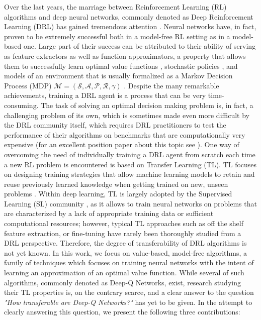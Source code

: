 Over the last years, the marriage between Reinforcement Learning (RL) algorithms and deep neural networks, commonly denoted as Deep Reinforcement Learning (DRL) \cite{franccois2018introduction} has gained tremendous attention \cite{henderson2018deep}. Neural networks have, in fact, proven to be extremely successful both in a model-free RL setting as in a model-based one. Large part of their success can be attributed to their ability of serving as feature extractors as well as function approximators, a property that allows them to successfully learn optimal value functions \cite{mnih2013playing,mnih2015human,van2016deep,zhao2016deep,wang2016dueling,sabatelli2020deep}, stochastic policies \cite{lillicrap2015continuous,schulman2015high,schulman2015trust,wang2016sample,mnih2016asynchronous,schulman2017proximal,haarnoja2018soft,fujimoto2018addressing}, and models of an environment \cite{ha2018world,kaiser2019model,hafner2019dream,hafner2019learning,hafner2020mastering} that is usually formalized as a Markov Decision Process (MDP) $\mathcal{M}=(\mathcal{S},\mathcal{A},\mathcal{P},\mathcal{R},\gamma)$ \cite{puterman1990markov}. Despite the many remarkable achievements, training a DRL agent is a process that can be very time-consuming. The task of solving an optimal decision making problem is,  in fact, a challenging problem of its own, which is sometimes made even more difficult by the DRL community itself, which requires DRL practitioners to test the performance of their algorithms on benchmarks that are computationally very expensive (for an excellent position paper about this topic see \cite{obando2020revisiting}). One way of overcoming the need of individually training a DRL agent from scratch each time a new RL problem is encountered is based on Transfer Learning (TL). TL focuses on designing training strategies that allow machine learning models to retain and reuse previously learned knowledge when getting trained on new, unseen problems \cite{pan2009survey, zhuang2020comprehensive}. Within deep learning, TL is largely adopted by the Supervised Learning (SL) community \cite{huh2016makes,mormont2018comparison,sabatelli2018deep,dominguez2019transfer,vandaele2021deep,ho2021evaluation}, as it allows to train neural networks on problems that are characterized by a lack of appropriate training data or sufficient computational resources; however, typical TL approaches such as off the shelf feature extraction, or fine-tuning \cite{sharif2014cnn} have rarely been thoroughly studied from a DRL perspective. Therefore, the degree of transferability of DRL algorithms is not yet known. In this work, we focus on value-based, model-free algorithms, a family of techniques which focuses on training neural networks with the intent of learning an approximation of an optimal value function. While several of such algorithms, commonly denoted as Deep-Q Networks, exist, research studying their TL properties is, on the contrary scarce, and a clear answer to the question \textit{"How transferable are Deep-Q Networks?"} has yet to be given. In the attempt to clearly answering this question, we present the following three contributions:

